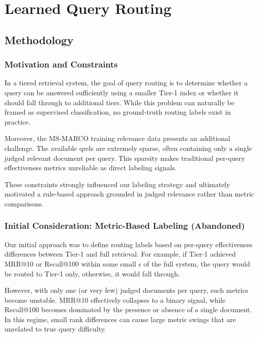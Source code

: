 \documentclass[11pt]{article}
\begin{document}
\section{Learned Query Routing}

\subsection{Methodology}

\subsubsection{Motivation and Constraints}

In a tiered retrieval system, the goal of query routing is to determine whether a query can be answered sufficiently using a smaller Tier-1 index or whether it should fall through to additional tiers. While this problem can naturally be framed as supervised classification, no ground-truth routing labels exist in practice.

Moreover, the MS-MARCO training relevance data presents an additional challenge. The available qrels are extremely sparse, often containing only a single judged relevant document per query. This sparsity makes traditional per-query effectiveness metrics unreliable as direct labeling signals.

These constraints strongly influenced our labeling strategy and ultimately motivated a rule-based approach grounded in judged relevance rather than metric comparisons.

\subsubsection{Initial Consideration: Metric-Based Labeling (Abandoned)}

Our initial approach was to define routing labels based on per-query effectiveness differences between Tier-1 and full retrieval. For example, if Tier-1 achieved MRR@10 or Recall@100 within some small $\epsilon$ of the full system, the query would be routed to Tier-1 only, otherwise, it would fall through.

However, with only one (or very few) judged documents per query, such metrics become unstable. MRR@10 effectively collapses to a binary signal, while Recall@100 becomes dominated by the presence or absence of a single document. In this regime, small rank differences can cause large metric swings that are unrelated to true query difficulty.
\end{document}
